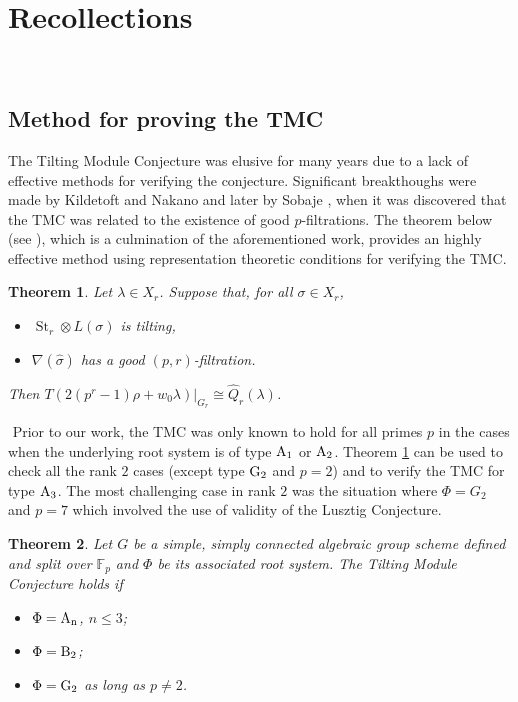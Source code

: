 \documentclass[twoside,11pt,reqno]{amsart}
\newcommand{\0}{\bar 0}
\newcommand{\1}{\bar 1}
\newcommand{\St}{\operatorname{St}}
\newtheorem{theorem}{Theorem}[subsection]
\theoremstyle{definition}
\numberwithin{equation}{subsection}
\begin{document}
\section{Recollections} \label{S:recall}
﻿
\subsection{Method for proving the TMC} \label{SS:methods} The Tilting Module Conjecture was elusive for many years due to a lack of effective methods for verifying the conjecture. 
Significant breakthoughs were made by Kildetoft and Nakano \cite{KN15} and later by Sobaje \cite{So18}, when it was discovered that the TMC was related to the existence of good $p$-filtrations. The theorem below (see \cite[Section 4]{BNPS22a}),
which is a culmination of the aforementioned work, provides an highly effective method using representation theoretic conditions for verifying the TMC. 
﻿
\begin{theorem}\label{T:TMCcriterion} Let $\lambda\in X_r$. Suppose that, for all $\sigma \in X_r$, 
\begin{itemize}
\item[(a)] $\St_r \otimes L(\sigma)$ is tilting,  
\item[(b)] $\nabla(\hat{\sigma})$ has  a good $(p,r)$-filtration. 
\end{itemize} 
Then $T(2(p^{r}-1)\rho+w_{0}\lambda)|_{G_{r}}\cong \widehat{Q}_{r}(\lambda)$. 
\end{theorem}
﻿
Prior to our work, the TMC was only known to hold for all primes $p$ in the cases when the underlying root system is of type $\rm{A}_{1}$ or $\rm{A}_{2}$. Theorem \ref{T:TMCcriterion} can be used to check all the rank $2$ cases (except type $\rm{G}_2$ and $p = 2$) and to verify the TMC for type $\rm{A}_{3}$. 
The most challenging case in rank $2$ was the situation where $\Phi=G_{2}$ and $p=7$ which involved the use of validity of the Lusztig Conjecture. 
﻿
\begin{theorem}\label{T:MainTheorem} Let $G$ be a simple, simply connected algebraic group scheme defined and split over ${\mathbb F}_{p}$ and $\Phi$ be its associated root system. The Tilting Module Conjecture 
holds if 
\begin{itemize} 
\item[(a)] $\Phi=\rm{A}_{n}$, $n\leq 3$;
\item[(b)] $\Phi=\rm{B}_{2}$;
\item[(c)] $\Phi=\rm{G}_{2}$ as long as $p\neq 2$.
\end{itemize} 
\end{theorem} 
﻿
\end{document}
